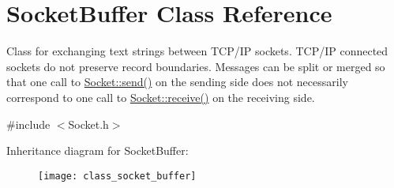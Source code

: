 \hypertarget{class_socket_buffer}{\section{Socket\-Buffer Class Reference}
\label{class_socket_buffer}
}


Class for exchanging text strings between T\-C\-P/\-I\-P sockets. T\-C\-P/\-I\-P connected sockets do not preserve record boundaries. Messages can be split or merged so that one call to \hyperlink{class_socket_a9275eacdb64056a53cf4b9cf54cd2f1a}{Socket\-::send()} on the sending side does not necessarily correspond to one call to \hyperlink{class_socket_aa5e98b6f2c4e26fcf90d71c8386fc09d}{Socket\-::receive()} on the receiving side.  




{\ttfamily \#include $<$Socket.\-h$>$}

Inheritance diagram for Socket\-Buffer\-:\begin{figure}[H]
\begin{center}
\leavevmode
\texttt{[image: class\_socket\_buffer]}
\end{center}
\end{figure}
